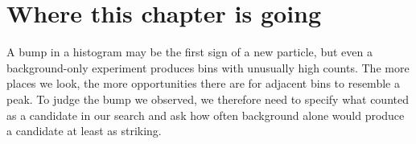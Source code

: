 \providecommand{\FourAGofMeanDiffErr}{}\renewcommand{\FourAGofMeanDiffErr}{0.002}
\providecommand{\FourAGofMeanErr}{}\renewcommand{\FourAGofMeanErr}{0.05}
\providecommand{\FourAKsD}{}\renewcommand{\FourAKsD}{0.1790}
\providecommand{\FourAKsDscipy}{}\renewcommand{\FourAKsDscipy}{0.1790}
\providecommand{\FourAKsPscipy}{}\renewcommand{\FourAKsPscipy}{0.0714}
\providecommand{\FourAKsPkolm}{}\renewcommand{\FourAKsPkolm}{0.0812}
\providecommand{\FourAKsPmc}{}\renewcommand{\FourAKsPmc}{0.0726}
\providecommand{\FourAKsSqrtnD}{}\renewcommand{\FourAKsSqrtnD}{1.266}
\providecommand{\FourAPzOneOne}{}\renewcommand{\FourAPzOneOne}{0.1587}
\providecommand{\FourAPzOneTwo}{}\renewcommand{\FourAPzOneTwo}{0.3173}
\providecommand{\FourAPzTwoOne}{}\renewcommand{\FourAPzTwoOne}{0.02275}
\providecommand{\FourAPzTwoTwo}{}\renewcommand{\FourAPzTwoTwo}{0.0455}
\providecommand{\FourAPzThreeOne}{}\renewcommand{\FourAPzThreeOne}{0.00135}
\providecommand{\FourAPzThreeTwo}{}\renewcommand{\FourAPzThreeTwo}{0.0027}
\providecommand{\FourAPzFourOne}{}\renewcommand{\FourAPzFourOne}{3.167\times10^{-5}}
\providecommand{\FourAPzFourTwo}{}\renewcommand{\FourAPzFourTwo}{6.334\times10^{-5}}
\providecommand{\FourAPzFiveOne}{}\renewcommand{\FourAPzFiveOne}{2.867\times10^{-7}}
\providecommand{\FourAPzFiveTwo}{}\renewcommand{\FourAPzFiveTwo}{5.733\times10^{-7}}
\providecommand{\FourAPzSixOne}{}\renewcommand{\FourAPzSixOne}{9.866\times10^{-10}}
\providecommand{\FourAPzSixTwo}{}\renewcommand{\FourAPzSixTwo}{1.973\times10^{-9}}
\providecommand{\FourAPzAnyThree}{}\renewcommand{\FourAPzAnyThree}{0.126}
\providecommand{\FourAPzAnyThreeMC}{}\renewcommand{\FourAPzAnyThreeMC}{0.126}
\providecommand{\FourAPzAnyFive}{}\renewcommand{\FourAPzAnyFive}{2.866\times10^{-5}}
\providecommand{\FourAPzPurThree}{}\renewcommand{\FourAPzPurThree}{0.270}
\providecommand{\FourAPzPurFive}{}\renewcommand{\FourAPzPurFive}{0.9994}
\providecommand{\FourAPzZfivepct}{}\renewcommand{\FourAPzZfivepct}{1.645}
\providecommand{\FourAPzZfivepctTwo}{}\renewcommand{\FourAPzZfivepctTwo}{1.960}
 
\section*{Where this chapter is going}
\label{4a:sec:roadmap}

A bump in a histogram may be the first sign of a new particle, but even
a background-only experiment produces bins with unusually high counts.
The more places we look, the more opportunities there are for adjacent
bins to resemble a peak. To judge the bump we observed, we therefore need
to specify what counted as a candidate in our search and ask how often
background alone would produce a candidate at least as striking.

